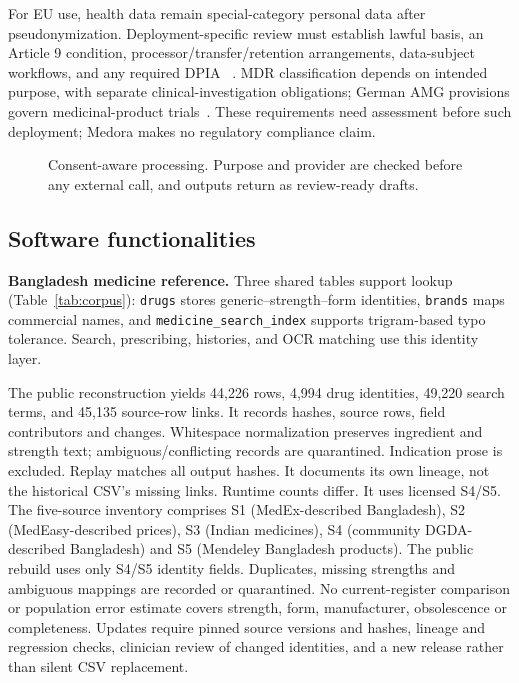 \documentclass[preprint,12pt,a4paper]{elsarticle}
\begin{document}
For EU use, health data remain special-category personal data after pseudonymization.
Deployment-specific review must establish lawful basis, an Article 9 condition,
processor/transfer/retention arrangements, data-subject workflows, and any required DPIA
~\cite{gdpr}. MDR classification depends on intended purpose, with separate clinical-investigation
obligations; German AMG provisions govern medicinal-product trials~\cite{mdr,amg}.
These requirements need assessment before such deployment; Medora makes no regulatory
compliance claim.

\begin{figure}[!htbp]
\centering\resizebox{\textwidth}{!}{}
\caption{Consent-aware processing. Purpose and provider are checked before any external
call, and outputs return as review-ready drafts.}
\label{fig:consent}
\end{figure}

\subsection{Software functionalities}

\textbf{Bangladesh medicine reference.} Three shared tables support lookup
(Table~\ref{tab:corpus}): \texttt{drugs} stores generic--strength--form identities,
\texttt{brands} maps commercial names, and \texttt{medicine\_search\_index} supports
trigram-based typo tolerance. Search, prescribing, histories, and OCR matching use this
identity layer.

The public reconstruction yields 44,226 rows, 4,994 drug identities, 49,220 search terms, and
45,135 source-row links. It records hashes, source rows, field contributors and changes.
Whitespace normalization preserves ingredient and strength text; ambiguous/conflicting
records are quarantined. Indication prose is excluded. Replay matches all output hashes.
It documents its own lineage, not the historical CSV's missing links.
Runtime counts differ. It uses licensed S4/S5.
The five-source inventory comprises S1 (MedEx-described Bangladesh), S2
(MedEasy-described prices), S3 (Indian medicines), S4 (community DGDA-described
Bangladesh) and S5 (Mendeley Bangladesh products). The public rebuild uses only S4/S5
identity fields. Duplicates, missing strengths and ambiguous mappings are recorded or
quarantined. No current-register comparison or population error estimate covers strength,
form, manufacturer, obsolescence or completeness. Updates require pinned source versions
and hashes, lineage and regression checks, clinician review of changed identities, and
a new release rather than silent CSV replacement.
\end{document}
